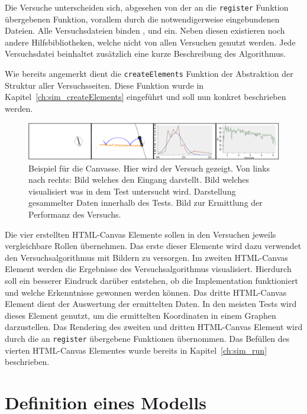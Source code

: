 Die Versuche unterscheiden sich, abgesehen von der an die \lstinline{register} Funktion übergebenen Funktion, vorallem durch die notwendigerweise eingebundenen Dateien.
Alle Versuchsdateien binden ,  und  ein.
Neben diesen existieren noch andere Hilfsbibliotheken, welche nicht von allen Versuchen genutzt werden.
Jede Versuchsdatei beinhaltet zusätzlich eine kurze Beschreibung des Algorithmus.

Wie bereits angemerkt dient die \lstinline{createElements} Funktion der Abstraktion der Struktur aller Versuchsseiten.
Diese Funktion wurde in Kapitel~\ref{ch:sim_createElements} eingeführt und soll nun konkret beschrieben werden.

\begin{figure}
    \includegraphics[width=\textwidth]{gfx/canvasses.png}
    \caption[Bild der Canvasse]{Beispiel für die Canvasse. Hier wird der Versuch  gezeigt. Von links nach rechts: Bild welches den Eingang darstellt. Bild welches visualisiert was in dem Test untersucht wird. Darstellung gesammelter Daten innerhalb des Tests. Bild zur Ermittlung der Performanz des Versuchs.}\label{fig:canvasses}
\end{figure}

Die vier erstellten HTML-Canvas Elemente sollen in den Versuchen jeweils vergleichbare Rollen übernehmen.
Das erste dieser Elemente wird dazu verwendet den Versuchsalgorithmus mit Bildern zu versorgen.
Im zweiten HTML-Canvas Element werden die Ergebnisse des Versuchsalgorithmus visualisiert.
Hierdurch soll ein besserer Eindruck darüber entstehen, ob die Implementation funktioniert und welche Erkenntnisse gewonnen werden können.
Das dritte HTML-Canvas Element dient der Auswertung der ermittelten Daten.
In den meisten Tests wird dieses Element genutzt, um die ermittelten Koordinaten in einem Graphen darzustellen.
Das Rendering des zweiten und dritten HTML-Canvas Element wird durch die an \lstinline{register} übergebene Funktionen übernommen.
Das Befüllen des vierten HTML-Canvas Elementes wurde bereits in Kapitel~\ref{ch:sim_run} beschrieben.

\section{Definition eines  Modells}

